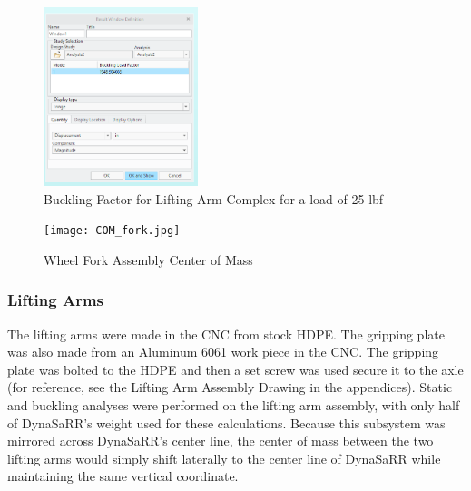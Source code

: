 \begin{figure}[hp]
    \centering
    \includegraphics[width=0.4\textwidth]{Images/front_wheel_buckle.PNG}
    \caption{Buckling Factor for Lifting Arm Complex for a load of 25 lbf}
    \label{fig:buckling}
\end{figure}
\newpage

\begin{figure}[hp]
    \centering
    \texttt{[image: COM\_fork.jpg]}
    \caption{Wheel Fork Assembly Center of Mass}
    \label{fig:Center of Mass}
\end{figure}
\newpage


\subsubsection{Lifting Arms}
The lifting arms were made in the CNC from stock HDPE. The gripping plate was also made from an Aluminum 6061 work piece in the CNC. The gripping plate was bolted to the HDPE and then a set screw was used secure it to the axle (for reference, see the Lifting Arm Assembly Drawing in the appendices). Static and buckling analyses were performed on the lifting arm assembly, with only half of DynaSaRR's weight used for these calculations. Because this subsystem was mirrored across DynaSaRR's center line, the center of mass between the two lifting arms would simply shift laterally to the center line of DynaSaRR while maintaining the same vertical coordinate.


